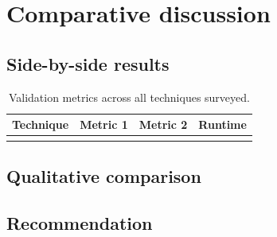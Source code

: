\section{Comparative discussion}
\label{sec:comparison}

\subsection{Side-by-side results}
\label{sec:comparison:results}

\begin{table}[H]
  \centering
  \caption{Validation metrics across all techniques surveyed.}
  \label{tab:comparison:metrics}
  \begin{tabularx}{\textwidth}{@{}L l l l@{}}
    \toprule
    \textbf{Technique} & \textbf{Metric 1} & \textbf{Metric 2} & \textbf{Runtime} \\
    \midrule
     & \placeholder{--} & \placeholder{--} & \placeholder{--} \\
    \bottomrule
  \end{tabularx}
\end{table}

\subsection{Qualitative comparison}
\label{sec:comparison:qualitative}

\subsection{Recommendation}
\label{sec:comparison:recommendation}
